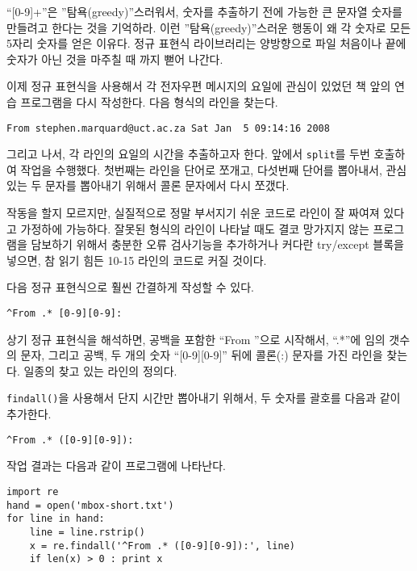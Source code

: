 ``[0-9]+''은 ''탐욕(greedy)''스러워서, 숫자를 추출하기 전에 가능한 큰 문자열 숫자를 만들려고 한다는 것을 기억하라.
이런 ''탐욕(greedy)''스러운 행동이 왜 각 숫자로 모든 5자리 숫자를 얻은 이유다.
정규 표현식 라이브러리는 양방향으로 파일 처음이나 끝에 숫자가 아닌 것을 마주칠 때 까지 뻗어 나간다.

이제 정규 표현식을 사용해서 각 전자우편 메시지의 요일에 관심이 있었던 책 앞의 연습 프로그램을 다시 작성한다.
다음 형식의 라인을 찾는다.

\beforeverb
\begin{verbatim}
From stephen.marquard@uct.ac.za Sat Jan  5 09:14:16 2008
\end{verbatim}
\afterverb
%

그리고 나서, 각 라인의 요일의 시간을 추출하고자 한다. 앞에서 {\tt split}를 두번 호출하여 작업을 수행했다. 첫번째는 라인을 단어로 쪼개고, 다섯번째 단어를 뽑아내서,
관심있는 두 문자를 뽑아내기 위해서 콜론 문자에서 다시 쪼갰다.


작동을 할지 모르지만, 실질적으로 정말 부서지기 쉬운 코드로 라인이 잘 짜여져 있다고 가정하에 가능하다. 
잘못된 형식의 라인이 나타날 때도 결코 망가지지 않는 프로그램을 담보하기 위해서 충분한 오류 검사기능을 추가하거나 커다란 try/except 블록을 넣으면, 
참 읽기 힘든 10-15 라인의 코드로 커질 것이다.

다음 정규 표현식으로 훨씬 간결하게 작성할 수 있다.

\beforeverb
\begin{verbatim}
^From .* [0-9][0-9]:
\end{verbatim}
\afterverb
%

상기 정규 표현식을 해석하면, 공백을 포함한 ``From ''으로 시작해서, ``.*''에 임의 갯수의 문자, 그리고 공백, 두 개의 숫자 ``[0-9][0-9]'' 뒤에 콜론(:) 문자를 가진 
라인을 찾는다. 일종의 찾고 있는 라인의 정의다. 

{\tt findall()}을 사용해서 단지 시간만 뽑아내기 위해서, 두 숫자를 괄호를 다음과 같이 추가한다.

\beforeverb
\begin{verbatim}
^From .* ([0-9][0-9]):
\end{verbatim}
\afterverb
%

작업 결과는 다음과 같이 프로그램에 나타난다.

\beforeverb
\begin{verbatim}
import re
hand = open('mbox-short.txt')
for line in hand:
    line = line.rstrip()
    x = re.findall('^From .* ([0-9][0-9]):', line)
    if len(x) > 0 : print x
\end{verbatim}
\afterverb
%

